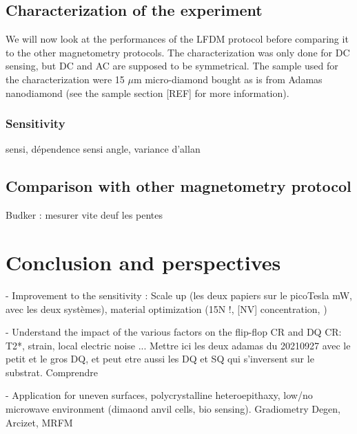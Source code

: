 \documentclass[a4paper,11pt]{report}
\begin{document}
\subsection{Characterization of the experiment}
We will now look at the performances of the LFDM protocol before comparing it to the other magnetometry protocols. The characterization was only done for DC sensing, but DC and AC are supposed to be symmetrical. The sample used for the characterization were 15 $\mu$m micro-diamond bought as is from Adamas nanodiamond (see the sample section [REF] for more information).
\subsubsection{Sensitivity}


sensi, dépendence sensi angle, variance d'allan
\subsection{Comparison with other magnetometry protocol}
Budker : mesurer vite deuf les pentes
\section{Conclusion and perspectives}
- Improvement to the sensitivity : Scale up (les deux papiers sur le picoTesla mW, avec les deux systèmes), material optimization (15N !, [NV] concentration, )

- Understand the impact of the various factors on the flip-flop CR and DQ CR: T2*, strain, local electric noise ... Mettre ici les deux adamas du 20210927 avec le petit et le gros DQ, et peut etre aussi les DQ et SQ qui s'inversent sur le substrat. Comprendre 

- Application for uneven surfaces, polycrystalline heteroepithaxy, low/no microwave environment (dimaond anvil cells, bio sensing). Gradiometry Degen, Arcizet, MRFM

\printbibliography
\end{document}
